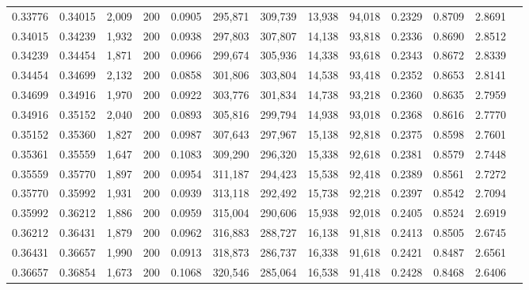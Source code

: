 \begin{tabular}{rrrrrrrrrrrrr}
0.33776 & 0.34015 &  2,009 & 200 &                                     0.0905 & 295,871 & 309,739 &  13,938 &  94,018 & 0.2329 & 0.8709 & 2.8691 \\
0.34015 & 0.34239 &  1,932 & 200 &                                     0.0938 & 297,803 & 307,807 &  14,138 &  93,818 & 0.2336 & 0.8690 & 2.8512 \\
0.34239 & 0.34454 &  1,871 & 200 &                                     0.0966 & 299,674 & 305,936 &  14,338 &  93,618 & 0.2343 & 0.8672 & 2.8339 \\
0.34454 & 0.34699 &  2,132 & 200 &                                     0.0858 & 301,806 & 303,804 &  14,538 &  93,418 & 0.2352 & 0.8653 & 2.8141 \\
0.34699 & 0.34916 &  1,970 & 200 &                                     0.0922 & 303,776 & 301,834 &  14,738 &  93,218 & 0.2360 & 0.8635 & 2.7959 \\
0.34916 & 0.35152 &  2,040 & 200 &                                     0.0893 & 305,816 & 299,794 &  14,938 &  93,018 & 0.2368 & 0.8616 & 2.7770 \\
0.35152 & 0.35360 &  1,827 & 200 &                                     0.0987 & 307,643 & 297,967 &  15,138 &  92,818 & 0.2375 & 0.8598 & 2.7601 \\
0.35361 & 0.35559 &  1,647 & 200 &                                     0.1083 & 309,290 & 296,320 &  15,338 &  92,618 & 0.2381 & 0.8579 & 2.7448 \\
0.35559 & 0.35770 &  1,897 & 200 &                                     0.0954 & 311,187 & 294,423 &  15,538 &  92,418 & 0.2389 & 0.8561 & 2.7272 \\
0.35770 & 0.35992 &  1,931 & 200 &                                     0.0939 & 313,118 & 292,492 &  15,738 &  92,218 & 0.2397 & 0.8542 & 2.7094 \\
0.35992 & 0.36212 &  1,886 & 200 &                                     0.0959 & 315,004 & 290,606 &  15,938 &  92,018 & 0.2405 & 0.8524 & 2.6919 \\
0.36212 & 0.36431 &  1,879 & 200 &                                     0.0962 & 316,883 & 288,727 &  16,138 &  91,818 & 0.2413 & 0.8505 & 2.6745 \\
0.36431 & 0.36657 &  1,990 & 200 &                                     0.0913 & 318,873 & 286,737 &  16,338 &  91,618 & 0.2421 & 0.8487 & 2.6561 \\
0.36657 & 0.36854 &  1,673 & 200 &                                     0.1068 & 320,546 & 285,064 &  16,538 &  91,418 & 0.2428 & 0.8468 & 2.6406 \\

\end{tabular}

